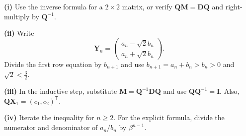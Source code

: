 \begin{hint}
\textbf{(i)} Use the inverse formula for a $2\times2$ matrix, or verify $\mathbf{Q}\mathbf{M}=\mathbf{D}\mathbf{Q}$ and right-multiply by $\mathbf{Q}^{-1}$.

\textbf{(ii)} Write
\[
\mathbf{Y}_n=
\begin{pmatrix}
a_n-\sqrt{2}b_n\\
a_n+\sqrt{2}b_n
\end{pmatrix}.
\]
Divide the first row equation by $b_{n+1}$ and use $b_{n+1}=a_n+b_n>b_n>0$ and $\sqrt{2}<\frac32$.

\textbf{(iii)} In the inductive step, substitute $\mathbf{M}=\mathbf{Q}^{-1}\mathbf{D}\mathbf{Q}$ and use $\mathbf{Q}\mathbf{Q}^{-1}=\mathbf{I}$. Also, $\mathbf{Q}\mathbf{X}_1=(c_1,c_2)^{\mathsf T}$.

\textbf{(iv)} Iterate the inequality for $n\ge2$. For the explicit formula, divide the numerator and denominator of $a_n/b_n$ by $\beta^{n-1}$.
\end{hint}

